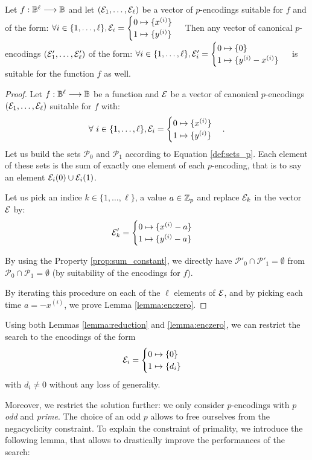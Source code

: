 \begin{lemma}
    Let $f: \mathbb{B}^\ell \longrightarrow \mathbb{B}$ and let $(\mathcal{E}_1, \dots, \mathcal{E}_\ell)$ be a vector of $p$-encodings suitable for $f$ and of the form: $\forall i \in \{1, \dots, \ell\}, \mathcal{E}_i = \begin{cases} 0 \mapsto \{x^{(i)}\} \\ 1 \mapsto \{y^{(i)}\} \end{cases}$
    Then any vector of canonical $p$-encodings $(\mathcal{E}'_1, \dots, \mathcal{E}'_\ell)$ of the form: $\forall i \in \{1, \dots, \ell\}, \mathcal{E}'_i = \begin{cases} 0 \mapsto \{0\} \\ 1 \mapsto \{y^{(i)} - x^{(i)}\} \end{cases}$
    is suitable for the function $f$ as well.
    \label{lemma:enczero}
\end{lemma}


\begin{proof}
Let $f: \mathbb{B}^\ell \longrightarrow \mathbb{B}$ be a function and $\mathcal{E}$ be a vector of canonical $p$-encodings $(\mathcal{E}_1, \dots, \mathcal{E}_\ell)$ suitable for $f$ with:
$$
\forall~i \in \{1, \dots, \ell\}, \mathcal{E}_i = \begin{cases} 0 \mapsto \{x^{(i)}\} \\ 1 \mapsto \{y^{(i)}\} \end{cases}.
$$
Let us build the sets $\mathcal{P}_0$ and $\mathcal{P}_1$ according to Equation \ref{def:sets_p}. Each element of these sets is the sum of exactly one element of each $p$-encoding, that is to say an element $\mathcal{E}_i(0) \cup \mathcal{E}_i(1)$.

Let us pick an indice $k \in \{1, \dots, \ell\}$, a value $a \in \mathbb{Z}_p$ and replace $\mathcal{E}_k$ in the vector $\mathcal{E}$ by: 
$$
\mathcal{E}'_k = \begin{cases} 0 \mapsto \{x^{(i)} - a\} \\ 1 \mapsto \{y^{(i)} - a\} \end{cases}
$$

By using the Property \ref{prop:sum_constant}, we directly have $\mathcal{P}'_0 \cap \mathcal{P}'_1 = \emptyset$ from $\mathcal{P}_0 \cap \mathcal{P}_1 = \emptyset$ (by suitability of the encodings for $f$).

By iterating this procedure on each of the $\ell$ elements of $\mathcal{E}$, and by picking each time $a = -x^{(i)}$, we prove Lemma \ref{lemma:enczero}.
\end{proof}



Using both Lemmas \ref{lemma:reduction} and \ref{lemma:enczero}, we can restrict the search to the encodings of the form $$\mathcal{E}_i = \begin{cases} 0 \mapsto \{0\} \\ 1 \mapsto \{d_i\} \end{cases}$$ with $d_i \ne 0$ without any loss of generality. 


Moreover, we restrict the solution further: we only consider $p$-encodings with $p$ \emph{odd} and \emph{prime}. The choice of an odd $p$ allows to free ourselves from the negacyclicity constraint. To explain the constraint of primality, we introduce the following lemma, that allows to drastically improve the performances of the search:

